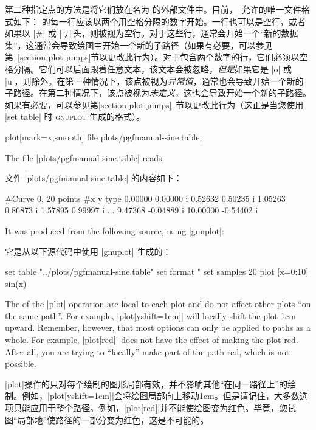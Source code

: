 第二种指定点的方法是将它们放在名为  的外部文件中。目前，\tikzname\ 允许的唯一文件格式如下： 的每一行应该以两个用空格分隔的数字开始。一行也可以是空行，或者如果以 |#| 或 |%
开头，则被视为空行。对于这些行，通常会开始一个“新的数据集”，这通常会导致绘图中开始一个新的子路径（如果有必要，可以参见第~\ref{section-plot-jumps}节以更改此行为）。对于包含两个数字的行，它们必须以空格分隔。它们可以后面跟着任意文本，该文本会被忽略，\emph{但是}如果它是 |o| 或 |u|，则除外。在第一种情况下，该点被视为\emph{异常值}，通常也会导致开始一个新的子路径。在第二种情况下，该点被视为\emph{未定义}，这也会导致开始一个新的子路径。如果有必要，可以参见第\ref{section-plot-jumps}~节以更改此行为（这正是当您使用 |set table| 时 \textsc{gnuplot} 生成的格式）。


%
\begin{codeexample}[]
\tikz \draw plot[mark=x,smooth] file {plots/pgfmanual-sine.table};
\end{codeexample}

The file |plots/pgfmanual-sine.table| reads:

文件 |plots/pgfmanual-sine.table| 的内容如下：

\begin{codeexample}
#Curve 0, 20 points
#x y type
0.00000 0.00000  i
0.52632 0.50235  i
1.05263 0.86873  i
1.57895 0.99997  i
...
9.47368 -0.04889  i
10.00000 -0.54402  i
\end{codeexample}
%
It was produced from the following source, using |gnuplot|:

它是从以下源代码中使用 |gnuplot| 生成的：


\begin{codeexample}
set table  "../plots/pgfmanual-sine.table"
set format "%
set samples 20
plot [x=0:10] sin(x)
\end{codeexample}

The  of the |plot| operation are local to each plot and do
not affect other plots ``on the same path''. For example, |plot[yshift=1cm]|
will locally shift the plot 1cm upward. Remember, however, that most options
can only be applied to paths as a whole. For example, |plot[red]| does not have
the effect of making the plot red. After all, you are trying to ``locally''
make part of the path red, which is not possible.

|plot|操作的只对每个绘制的图形局部有效，并不影响其他“在同一路径上”的绘制。例如，|plot[yshift=1cm]|会将绘图局部向上移动1cm。但是请记住，大多数选项只能应用于整个路径。例如，|plot[red]|并不能使绘图变为红色。毕竟，您试图“局部地”使路径的一部分变为红色，这是不可能的。



